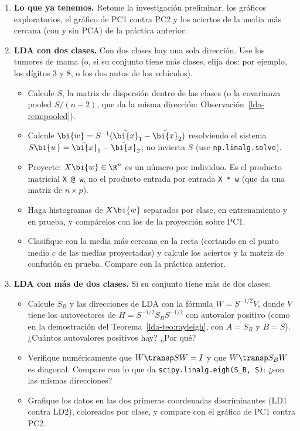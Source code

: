 \begin{enumerate}[leftmargin=*,label=\textbf{L.\arabic*},ref=L.\arabic*,itemsep=6pt]

\item \textbf{Lo que ya tenemos.} Retome la investigación preliminar, los
gráficos exploratorios, el gráfico de PC1 contra PC2 y los aciertos de la
media más cercana (con y sin PCA) de la práctica anterior.

\item \textbf{LDA con dos clases.}\label{lda-p:dos} Con dos clases hay una sola
dirección. Use los tumores de mama (o, si su conjunto tiene más clases, elija
dos: por ejemplo, los dígitos $3$ y $8$, o los dos autos de los vehículos).
\begin{itemize}[itemsep=1pt]
\item Calcule $S$, la matriz de dispersión dentro de las clases (o la
covarianza pooled $S/(n-2)$, que da la misma dirección:
Observación~\ref{lda-rem:pooled}).
\item Calcule $\bi{w}=S^{-1}(\bar{\bi{x}}_1-\bar{\bi{x}}_2)$ resolviendo el sistema
$S\bi{w}=\bar{\bi{x}}_1-\bar{\bi{x}}_2$; no invierta $S$ (use \texttt{np.linalg.solve}).
\item Proyecte: $X\bi{w}\in\R^n$ es un número por individuo. Es el producto
matricial \texttt{X @ w}, no el producto entrada por entrada \texttt{X * w}
(que da una matriz de $n\times p$).
\item Haga histogramas de $X\bi{w}$ separados por clase, en entrenamiento y en
prueba, y compárelos con los de la proyección sobre PC1.
\item Clasifique con la media más cercana en la recta (cortando en el punto
medio $c$ de las medias proyectadas) y calcule los aciertos y la matriz de
confusión en prueba. Compare con la práctica anterior.
\end{itemize}

\item \textbf{LDA con más de dos clases.}\label{lda-p:multi} Si su conjunto
tiene más de dos clases:
\begin{itemize}[itemsep=1pt]
\item Calcule $S_B$ y las direcciones de LDA con la fórmula
$W=S^{-1/2}V$, donde $V$ tiene los autovectores de
$H=S^{-1/2}S_BS^{-1/2}$ con autovalor positivo
(como en la demostración del Teorema~\ref{lda-teo:rayleigh}, con $A=S_B$ y
$B=S$). ¿Cuántos
autovalores positivos hay? ¿Por qué?
\item Verifique numéricamente que $W\transp SW=I$ y que $W\transp S_BW$ es
diagonal. Compare con lo que da \texttt{scipy.linalg.eigh(S\_B, S)}: ¿son las
mismas direcciones?
\item Grafique los datos en las dos primeras coordenadas discriminantes (LD1
contra LD2), coloreados por clase, y compare con el gráfico de PC1 contra PC2.
\end{itemize}


\end{enumerate}
